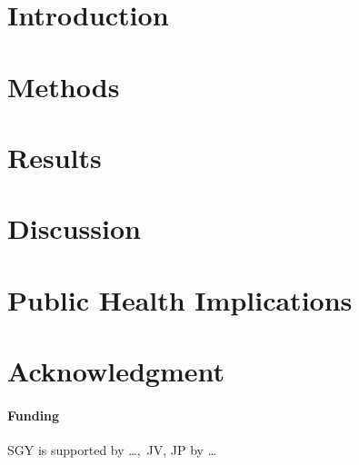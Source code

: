\documentclass{bioinfo}
\begin{document}
\section{Introduction}


\section{Methods}
\begin{methods}

\end{methods}

\section{Results}


\section{Discussion}


\section{Public Health Implications}


\section*{Acknowledgment}
\paragraph{Funding\textcolon} SGY is supported by \ldots,\ JV, JP by \ldots

%

%

\end{document}
